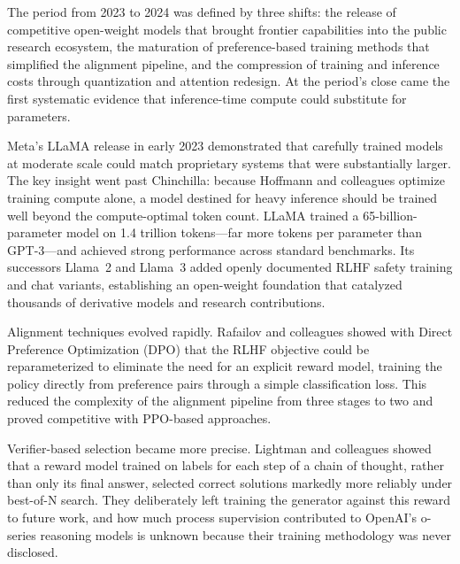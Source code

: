 
The period from 2023 to 2024 was defined by three shifts: the release of competitive open-weight models that brought frontier capabilities into the public research ecosystem, the maturation of preference-based training methods that simplified the alignment pipeline, and the compression of training and inference costs through quantization and attention redesign. At the period's close came the first systematic evidence that inference-time compute could substitute for parameters.

Meta's LLaMA release in early 2023 demonstrated that carefully trained models at moderate scale could match proprietary systems that were substantially larger. The key insight went past Chinchilla: because Hoffmann and colleagues optimize training compute alone, a model destined for heavy inference should be trained well beyond the compute-optimal token count. LLaMA trained a 65-billion-parameter model on 1.4 trillion tokens---far more tokens per parameter than GPT-3---and achieved strong performance across standard benchmarks. Its successors Llama~2 and Llama~3 added openly documented RLHF safety training and chat variants, establishing an open-weight foundation that catalyzed thousands of derivative models and research contributions.

Alignment techniques evolved rapidly. Rafailov and colleagues showed with Direct Preference Optimization (DPO) that the RLHF objective could be reparameterized to eliminate the need for an explicit reward model, training the policy directly from preference pairs through a simple classification loss. This reduced the complexity of the alignment pipeline from three stages to two and proved competitive with PPO-based approaches.

Verifier-based selection became more precise. Lightman and colleagues showed that a reward model trained on labels for each step of a chain of thought, rather than only its final answer, selected correct solutions markedly more reliably under best-of-N search. They deliberately left training the generator against this reward to future work, and how much process supervision contributed to OpenAI's o-series reasoning models is unknown because their training methodology was never disclosed.

